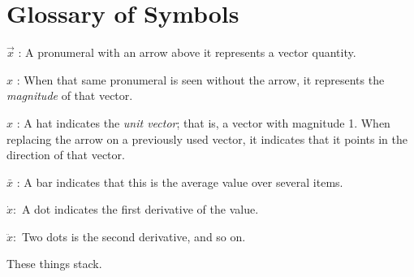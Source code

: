 \appendix

\chapter{Glossary of Symbols}
	
		\begin{description}		
        	\item $\vec{x}$ : A pronumeral with an arrow above it represents a vector quantity. 		
			\item $x$ : When that same pronumeral is seen without the arrow, it represents the \textit{magnitude} of that vector.	
			\item $\hat{x}$ : A hat indicates the \textit{unit vector}; that is, a vector with magnitude 1. When replacing the arrow on a previously used vector, it indicates that it points in the direction of that vector.	
			\item $\bar{x}$ : A bar indicates that this is the average value over several items.
			\item $\dot{x}:$ A dot indicates the first derivative of the value.		
			\item $\ddot{x}:$ Two dots is the second derivative, and so on.
		
		These things stack.
        
		\end{description}
		
		
		
